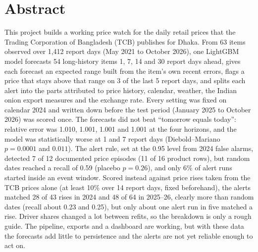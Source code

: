 \chapter*{Abstract}
This project builds a working price watch for the daily retail prices that the Trading Corporation of Bangladesh (TCB) publishes for Dhaka. From 63 items observed over 1,412 report days (May 2021 to October 2026), one LightGBM model forecasts 54 long-history items 1, 7, 14 and 30 report days ahead, gives each forecast an expected range built from the item's own recent errors, flags a price that stays above that range on 3 of the last 5 report days, and splits each alert into the parts attributed to price history, calendar, weather, the Indian onion export measures and the exchange rate. Every setting was fixed on calendar 2024 and written down before the test period (January 2025 to October 2026) was scored once. The forecasts did not beat ``tomorrow equals today'': relative error was 1.010, 1.001, 1.001 and 1.001 at the four horizons, and the model was statistically worse at 1 and 7 report days (Diebold--Mariano $p=0.0001$ and $0.011$). The alert rule, set at the 0.95 level from 2024 false alarms, detected 7 of 12 documented price episodes (11 of 16 product rows), but random dates reached a recall of 0.59 (placebo $p=0.26$), and only 6\% of alert runs started inside an event window. Scored instead against price rises taken from the TCB prices alone (at least 10\% over 14 report days, fixed beforehand), the alerts matched 28 of 43 rises in 2024 and 48 of 64 in 2025--26, clearly more than random dates (recall about 0.23 and 0.25), but only about one alert run in five matched a rise. Driver shares changed a lot between refits, so the breakdown is only a rough guide. The pipeline, exports and a dashboard are working, but with these data the forecasts add little to persistence and the alerts are not yet reliable enough to act on.
